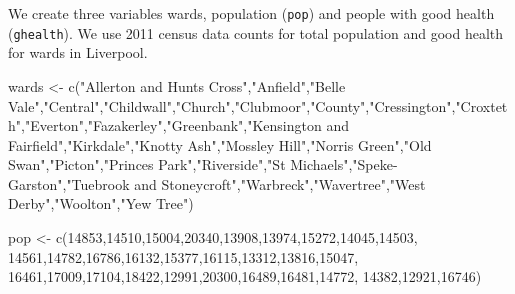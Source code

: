 \documentclass[
  letterpaper,
  krantz2]{style/krantz}
\newenvironment{Shaded}{\begin{snugshade}}{\end{snugshade}}
\newcommand{\DecValTok}[1]{\textcolor[rgb]{0.68,0.00,0.00}{#1}}
\newcommand{\FunctionTok}[1]{\textcolor[rgb]{0.28,0.35,0.67}{#1}}
\newcommand{\NormalTok}[1]{\textcolor[rgb]{0.00,0.23,0.31}{#1}}
\newcommand{\OtherTok}[1]{\textcolor[rgb]{0.00,0.23,0.31}{#1}}
\newcommand{\StringTok}[1]{\textcolor[rgb]{0.13,0.47,0.30}{#1}}
\begin{document}
We create three variables wards, population (\texttt{pop}) and people
with good health (\texttt{ghealth}). We use 2011 census data counts for
total population and good health for wards in Liverpool.

\begin{Shaded}
\begin{Highlighting}[]
\NormalTok{wards }\OtherTok{\textless{}{-}} \FunctionTok{c}\NormalTok{(}\StringTok{"Allerton and Hunts Cross"}\NormalTok{,}\StringTok{"Anfield"}\NormalTok{,}\StringTok{"Belle Vale"}\NormalTok{,}\StringTok{"Central"}\NormalTok{,}\StringTok{"Childwall"}\NormalTok{,}\StringTok{"Church"}\NormalTok{,}\StringTok{"Clubmoor"}\NormalTok{,}\StringTok{"County"}\NormalTok{,}\StringTok{"Cressington"}\NormalTok{,}\StringTok{"Croxteth"}\NormalTok{,}\StringTok{"Everton"}\NormalTok{,}\StringTok{"Fazakerley"}\NormalTok{,}\StringTok{"Greenbank"}\NormalTok{,}\StringTok{"Kensington and Fairfield"}\NormalTok{,}\StringTok{"Kirkdale"}\NormalTok{,}\StringTok{"Knotty Ash"}\NormalTok{,}\StringTok{"Mossley Hill"}\NormalTok{,}\StringTok{"Norris Green"}\NormalTok{,}\StringTok{"Old Swan"}\NormalTok{,}\StringTok{"Picton"}\NormalTok{,}\StringTok{"Princes Park"}\NormalTok{,}\StringTok{"Riverside"}\NormalTok{,}\StringTok{"St Michael\textquotesingle{}s"}\NormalTok{,}\StringTok{"Speke{-}Garston"}\NormalTok{,}\StringTok{"Tuebrook and Stoneycroft"}\NormalTok{,}\StringTok{"Warbreck"}\NormalTok{,}\StringTok{"Wavertree"}\NormalTok{,}\StringTok{"West Derby"}\NormalTok{,}\StringTok{"Woolton"}\NormalTok{,}\StringTok{"Yew Tree"}\NormalTok{)}

\NormalTok{pop }\OtherTok{\textless{}{-}} \FunctionTok{c}\NormalTok{(}\DecValTok{14853}\NormalTok{,}\DecValTok{14510}\NormalTok{,}\DecValTok{15004}\NormalTok{,}\DecValTok{20340}\NormalTok{,}\DecValTok{13908}\NormalTok{,}\DecValTok{13974}\NormalTok{,}\DecValTok{15272}\NormalTok{,}\DecValTok{14045}\NormalTok{,}\DecValTok{14503}\NormalTok{,}
                \DecValTok{14561}\NormalTok{,}\DecValTok{14782}\NormalTok{,}\DecValTok{16786}\NormalTok{,}\DecValTok{16132}\NormalTok{,}\DecValTok{15377}\NormalTok{,}\DecValTok{16115}\NormalTok{,}\DecValTok{13312}\NormalTok{,}\DecValTok{13816}\NormalTok{,}\DecValTok{15047}\NormalTok{,}
                \DecValTok{16461}\NormalTok{,}\DecValTok{17009}\NormalTok{,}\DecValTok{17104}\NormalTok{,}\DecValTok{18422}\NormalTok{,}\DecValTok{12991}\NormalTok{,}\DecValTok{20300}\NormalTok{,}\DecValTok{16489}\NormalTok{,}\DecValTok{16481}\NormalTok{,}\DecValTok{14772}\NormalTok{,}
                \DecValTok{14382}\NormalTok{,}\DecValTok{12921}\NormalTok{,}\DecValTok{16746}\NormalTok{)}


\end{Highlighting}
\end{Shaded}
\end{document}
